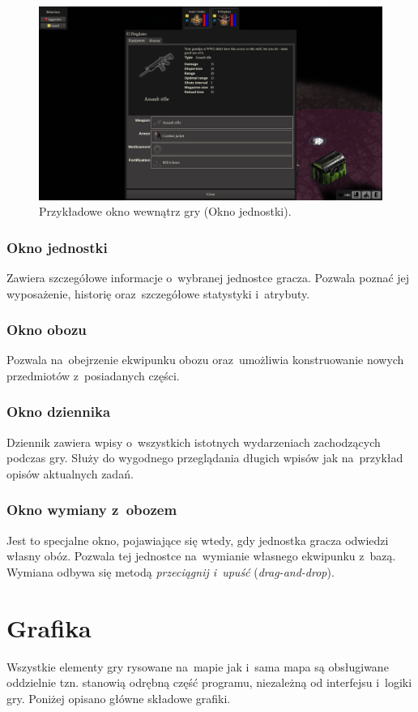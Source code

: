 \documentclass[licencjacka]{pracamgr}
\begin{document}
      \begin{figure}[htbp]
	\centering
	\includegraphics[scale=0.22]{Window.png}
	\caption{Przykładowe okno wewnątrz gry (Okno jednostki).}
      \end{figure}

      \subsubsection{Okno jednostki}
	Zawiera szczegółowe informacje o~wybranej jednostce gracza. Pozwala poznać jej wyposażenie, historię oraz~szczegółowe statystyki i~atrybuty.
      \subsubsection{Okno obozu}
	Pozwala na~obejrzenie ekwipunku obozu oraz~umożliwia konstruowanie nowych przedmiotów z~posiadanych części.
      \subsubsection{Okno dziennika}
	Dziennik zawiera wpisy o~wszystkich istotnych wydarzeniach zachodzących podczas gry. Służy do wygodnego przeglądania długich wpisów jak na~przykład
	opisów aktualnych zadań.
      \subsubsection{Okno wymiany z~obozem}
	Jest to specjalne okno, pojawiające się wtedy, gdy jednostka gracza odwiedzi własny obóz. Pozwala tej jednostce na~wymianie własnego ekwipunku z~bazą.
	Wymiana odbywa się metodą \emph{przeciągnij i~upuść} (\emph{drag-and-drop}).


  \section{Grafika}
    Wszystkie elementy gry rysowane na~mapie jak i~sama mapa są obsługiwane oddzielnie tzn. stanowią odrębną część programu, niezależną od interfejsu i~logiki gry.
    Poniżej opisano główne składowe grafiki.
\end{document}
